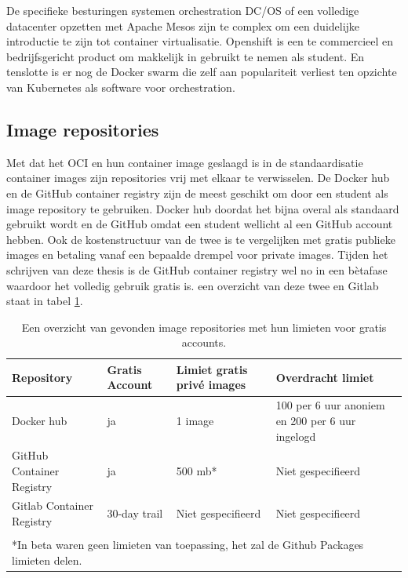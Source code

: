 De specifieke besturingen systemen orchestration DC/OS of een volledige datacenter opzetten met Apache Mesos zijn te complex om een duidelijke introductie te zijn tot container virtualisatie.  Openshift is een te commercieel en bedrijfsgericht product om makkelijk in gebruikt te nemen als student. En tenslotte is er nog de Docker swarm die zelf aan populariteit verliest ten opzichte van Kubernetes als software voor orchestration.


\subsection{Image repositories}
Met dat het OCI en hun container image geslaagd is in de standaardisatie container images zijn repositories vrij met elkaar te verwisselen. De Docker hub en de GitHub container registry zijn de meest geschikt om door een student als image repository te gebruiken.  Docker hub doordat het bijna overal als standaard gebruikt wordt en de GitHub omdat een student wellicht al een GitHub account hebben. Ook de kostenstructuur van de twee is te vergelijken met gratis publieke images en betaling vanaf een bepaalde drempel voor private images. Tijden het schrijven van deze thesis is de GitHub container registry wel no in een bètafase waardoor het volledig gebruik gratis is. een overzicht van deze twee en Gitlab staat in tabel \ref{tab:repositories}.

\begin{center}
    \begin{table}
        \begin{tabular}{ m{3.5cm} || m{2cm} | m{3.3cm} | m{4.5cm} }
            Repository & Gratis Account & Limiet gratis privé images & Overdracht limiet \\ 
            \hline
            Docker hub & ja & 1 image & 100 per 6 uur anoniem en 200 per 6 uur ingelogd
             \\  
            \hline
            GitHub Container Registry & ja & 500 mb* & Niet gespecifieerd \\
            \hline 
            Gitlab Container Registry & 30-day trail & Niet gespecifieerd & Niet gespecifieerd \\
            \multicolumn{4}{c}{ } \\
            \multicolumn{4}{l}{*In beta waren geen limieten van toepassing, het zal de Github Packages limieten delen.} \\
        \end{tabular}
        \caption[Overzicht image repositories]{Een overzicht van gevonden image repositories met hun limieten voor gratis accounts.}
        \label{tab:repositories}
    \end{table}
\end{center}

